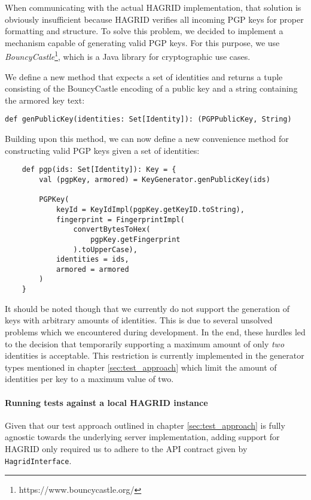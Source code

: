 When communicating with the actual HAGRID implementation, that solution is obviously insufficient because HAGRID verifies all incoming PGP keys for proper formatting and structure. To solve this problem, we decided to implement a mechanism capable of generating valid PGP keys. 
For this purpose, we use \emph{BouncyCastle}\footnote{https://www.bouncycastle.org/}, which is a Java library for cryptographic use cases.

We define a new method that expects a set of identities and returns a tuple consisting of the BouncyCastle encoding of a public key and a string containing the armored key text:
\begin{verbatim}
def genPublicKey(identities: Set[Identity]): (PGPPublicKey, String)
\end{verbatim}

Building upon this method, we can now define a new convenience method for constructing valid PGP keys given a set of identities: 
\begin{code}
    \begin{verbatim}
    def pgp(ids: Set[Identity]): Key = {
        val (pgpKey, armored) = KeyGenerator.genPublicKey(ids)
    
        PGPKey(
            keyId = KeyIdImpl(pgpKey.getKeyID.toString),
            fingerprint = FingerprintImpl(
                convertBytesToHex(
                    pgpKey.getFingerprint
                ).toUpperCase),
            identities = ids,
            armored = armored
        )
    }
    \end{verbatim}
\end{code}
It should be noted though that we currently do not support the generation of keys with arbitrary amounts of identities. This is due to several unsolved problems which we encountered during development. In the end, these hurdles led to the decision that temporarily supporting a maximum amount of only \emph{two} identities is acceptable. This restriction is currently implemented in the generator types mentioned in chapter \ref{sec:test_approach} which limit the amount of identities per key to a maximum value of two.
\paragraph{Running tests against a local HAGRID instance} Given that our test approach outlined in chapter \ref{sec:test_approach} is fully agnostic towards the underlying server implementation, adding support for HAGRID only required us to adhere to the API contract given by \texttt{HagridInterface}.
